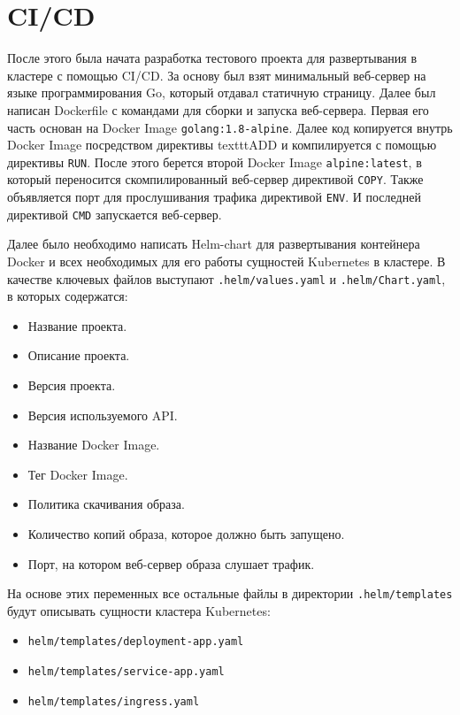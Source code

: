 \section{CI/CD}
\label{sec:ci-cd}

После этого была начата разработка тестового проекта для развертывания в кластере с помощью CI/CD.
За основу был взят минимальный веб-сервер на языке программирования Go,
который отдавал статичную страницу. Далее был написан Dockerfile
с командами для сборки и запуска веб-сервера. Первая его часть основан на Docker Image
\texttt{golang:1.8-alpine}. Далее код копируется внутрь Docker Image посредством директивы texttt{ADD} и компилируется с помощью директивы \texttt{RUN}. После этого берется второй Docker Image \texttt{alpine:latest}, в который переносится скомпилированный веб-сервер директивой \texttt{COPY}. Также объявляется порт для прослушивания трафика директивой \texttt{ENV}. И последней директивой \texttt{CMD} запускается веб-сервер.

Далее было необходимо написать Helm-chart для развертывания контейнера Docker и всех необходимых для его работы сущностей Kubernetes в кластере. В качестве ключевых файлов выступают \texttt{.helm/values.yaml} и \texttt{.helm/Chart.yaml}, в которых содержатся:

\begin{itemize}
    \item Название проекта.
    \item Описание проекта.
    \item Версия проекта.
    \item Версия используемого API.
    \item Название Docker Image.
    \item Тег Docker Image.
    \item Политика скачивания образа.
    \item Количество копий образа, которое должно быть запущено.
    \item Порт, на котором веб-сервер образа слушает трафик.
\end{itemize}

На основе этих переменных все остальные файлы в директории \texttt{.helm/templates} будут описывать сущности кластера Kubernetes:

\begin{itemize}
    \item \texttt{helm/templates/deployment-app.yaml}
    \item \texttt{helm/templates/service-app.yaml}
    \item \texttt{helm/templates/ingress.yaml}
\end{itemize}

